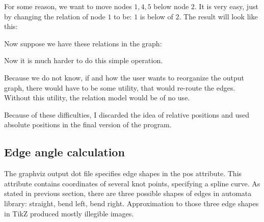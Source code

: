 \documentclass{ctuthesis}
\begin{document}
For some reason, we want to move nodes $1,4,5$ below node $2$. It is very easy, just by changing the relation of node $1$ to be: $1$ is below of $2$. The result will look like this:

\begin{figure}[H]
\centering
{}
\end{figure}

Now suppose we have these relations in the graph:
\begin{figure}[H]
\centering
{}
\end{figure}

Now it is much harder to do this simple operation. 

Because we do not know, if and how the user wants to reorganize the output graph, there would have to be some utility, that would re-route the edges. Without this utility, the relation model would be of no use.

Because of these difficulties, I discarded the idea of relative positions and used absolute positions in the final version of the program.

\subsection{Edge angle calculation}
\label{subsec:edge-angle}
The graphviz output dot file specifies edge shapes in the pos attribute. This attribute contains coordinates of several knot points, specifying a spline curve. As stated in previous section, there are three possible shapes of edges in automata library: straight, bend left, bend right. Approximation to those three edge shapes in TikZ produced mostly illegible images. 
\end{document}
